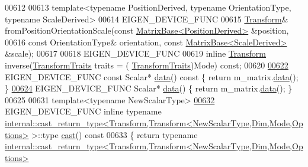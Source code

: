 \begin{DoxyCode}
00612 
00613   \textcolor{keyword}{template}<\textcolor{keyword}{typename} PositionDerived, \textcolor{keyword}{typename} OrientationType, \textcolor{keyword}{typename} ScaleDerived>
00614   EIGEN\_DEVICE\_FUNC
00615   \hyperlink{group___geometry___module_class_eigen_1_1_transform}{Transform}& fromPositionOrientationScale(\textcolor{keyword}{const} 
      \hyperlink{group___core___module_class_eigen_1_1_matrix_base}{MatrixBase<PositionDerived>} &position,
00616     \textcolor{keyword}{const} OrientationType& orientation, \textcolor{keyword}{const} \hyperlink{group___core___module_class_eigen_1_1_matrix_base}{MatrixBase<ScaleDerived>} &scale);
00617 
00618   EIGEN\_DEVICE\_FUNC
00619   \textcolor{keyword}{inline} \hyperlink{group___geometry___module_class_eigen_1_1_transform}{Transform} inverse(\hyperlink{group__enums_gaee59a86102f150923b0cac6d4ff05107}{TransformTraits} traits = (
      \hyperlink{group__enums_gaee59a86102f150923b0cac6d4ff05107}{TransformTraits})Mode) \textcolor{keyword}{const};
00620 
\hyperlink{group___geometry___module_a75c33d8e3769936887149c9fca3e709f}{00622}   EIGEN\_DEVICE\_FUNC \textcolor{keyword}{const} Scalar* \hyperlink{group___geometry___module_a75c33d8e3769936887149c9fca3e709f}{data}()\textcolor{keyword}{ const }\{ \textcolor{keywordflow}{return} m\_matrix.\hyperlink{class_eigen_1_1_plain_object_base_ac25699535374b1854cf8494e44ad31b2}{data}(); \}
\hyperlink{group___geometry___module_a57a9ca46062164c4f14342e561e595b9}{00624}   EIGEN\_DEVICE\_FUNC Scalar* \hyperlink{group___geometry___module_a57a9ca46062164c4f14342e561e595b9}{data}() \{ \textcolor{keywordflow}{return} m\_matrix.\hyperlink{class_eigen_1_1_plain_object_base_ac25699535374b1854cf8494e44ad31b2}{data}(); \}
00625 
00631   \textcolor{keyword}{template}<\textcolor{keyword}{typename} NewScalarType>
\hyperlink{group___geometry___module_a4cf2dbae6e95d9efbaae83ab3308ef61}{00632}   EIGEN\_DEVICE\_FUNC \textcolor{keyword}{inline} \textcolor{keyword}{typename} 
      \hyperlink{struct_eigen_1_1internal_1_1cast__return__type}{internal::cast\_return\_type<Transform,Transform<NewScalarType,Dim,Mode,Options>}
       >::type \hyperlink{group___geometry___module_a4cf2dbae6e95d9efbaae83ab3308ef61}{cast}()\textcolor{keyword}{ const}
00633 \textcolor{keyword}{  }\{ \textcolor{keywordflow}{return} \textcolor{keyword}{typename} 
      \hyperlink{struct_eigen_1_1internal_1_1cast__return__type}{internal::cast\_return\_type<Transform,Transform<NewScalarType,Dim,Mode,Options>}

\end{DoxyCode}
